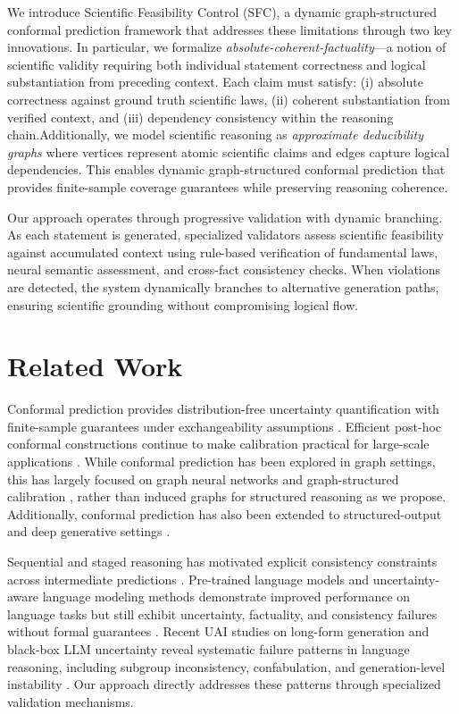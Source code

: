 \documentclass{uai2026} %
\theoremstyle{remark}
\theoremstyle{plain}
\theoremstyle{definition}
\begin{document}
We introduce Scientific Feasibility Control (SFC), a dynamic graph-structured conformal prediction framework that addresses these limitations through two key innovations. In particular, we formalize \emph{absolute-coherent-factuality}—a notion of scientific validity requiring both individual statement correctness and logical substantiation from preceding context. Each claim must satisfy: (i) absolute correctness against ground truth scientific laws, (ii) coherent substantiation from verified context, and (iii) dependency consistency within the reasoning chain.Additionally, we model scientific reasoning as \emph{approximate deducibility graphs} where vertices represent atomic scientific claims and edges capture logical dependencies. This enables dynamic graph-structured conformal prediction that provides finite-sample coverage guarantees while preserving reasoning coherence.

Our approach operates through progressive validation with dynamic branching. As each statement is generated, specialized validators assess scientific feasibility against accumulated context using rule-based verification of fundamental laws, neural semantic assessment, and cross-fact consistency checks. When violations are detected, the system dynamically branches to alternative generation paths, ensuring scientific grounding without compromising logical flow.



\section{Related Work}

Conformal prediction provides distribution-free uncertainty quantification with finite-sample guarantees under exchangeability assumptions \cite{pmlr-v216-ghosh23a,pmlr-v244-colombo24a}. Efficient post-hoc conformal constructions continue to make calibration practical for large-scale applications \cite{pmlr-v244-colombo24a,pmlr-v286-shahrokhi25a}. While conformal prediction has been explored in graph settings, this has largely focused on graph neural networks and graph-structured calibration \cite{pmlr-v286-akgul25a,pmlr-v286-zhang25g}, rather than induced graphs for structured reasoning as we propose. Additionally, conformal prediction has also been extended to structured-output and deep generative settings \cite{pmlr-v286-shahrokhi25a}.

Sequential and staged reasoning has motivated explicit consistency constraints across intermediate predictions \cite{pmlr-v244-jazbec24a}. Pre-trained language models and uncertainty-aware language modeling methods demonstrate improved performance on language tasks but still exhibit uncertainty, factuality, and consistency failures without formal guarantees \cite{pmlr-v216-li23d,pmlr-v286-li25b}. Recent UAI studies on long-form generation and black-box LLM uncertainty reveal systematic failure patterns in language reasoning, including subgroup inconsistency, confabulation, and generation-level instability \cite{pmlr-v286-liu25a,pmlr-v286-xiao25a,pmlr-v286-li25b}. Our approach directly addresses these patterns through specialized validation mechanisms.
\end{document}
